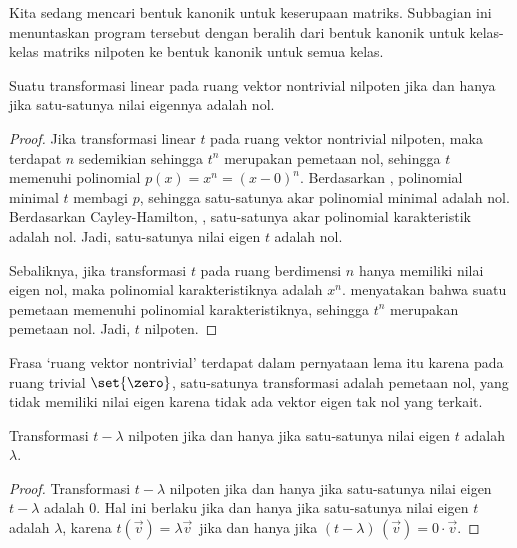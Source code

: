 Kita sedang mencari bentuk kanonik untuk keserupaan matriks.
Subbagian ini menuntaskan program tersebut dengan beralih
dari bentuk kanonik untuk kelas-kelas
matriks nilpoten ke
bentuk kanonik untuk semua kelas.

\begin{lemma} \label{le:NilIffOnlyEigenZero}
Suatu transformasi linear pada ruang vektor nontrivial
nilpoten jika dan hanya jika satu-satunya nilai eigennya adalah nol.
\end{lemma}

\begin{proof}
Jika transformasi linear $t$ pada ruang vektor nontrivial
nilpoten, maka terdapat
$n$ sedemikian sehingga $t^n$ merupakan pemetaan nol,
sehingga $t$ memenuhi polinomial $p(x)=x^n=(x-0)^n$.
Berdasarkan , polinomial minimal
$t$ membagi $p$, sehingga satu-satunya akar polinomial minimal adalah nol.
Berdasarkan Cayley-Hamilton, ,
satu-satunya akar polinomial karakteristik adalah nol.
Jadi, satu-satunya nilai eigen $t$ adalah nol.

Sebaliknya, jika transformasi \( t \) pada ruang
berdimensi \( n \) hanya memiliki nilai eigen nol,
maka polinomial karakteristiknya adalah \( x^n \).
 menyatakan bahwa suatu pemetaan memenuhi
polinomial karakteristiknya, sehingga \( t^n \) merupakan pemetaan nol.
Jadi, $t$ nilpoten.
\end{proof}

\noindent Frasa `ruang vektor nontrivial' terdapat dalam pernyataan
lema itu karena pada ruang trivial
$\set{\zero}$, satu-satunya transformasi adalah pemetaan nol, yang tidak memiliki
nilai eigen karena tidak ada vektor eigen tak nol yang terkait.

\begin{corollary} \label{cor:tMinLambdaNilpotent}
Transformasi $t-\lambda$ nilpoten jika dan hanya jika
satu-satunya nilai eigen $t$ adalah $\lambda$.
\end{corollary}

\begin{proof}
Transformasi \( t-\lambda \) nilpoten jika dan hanya jika
satu-satunya nilai eigen $t-\lambda$ adalah \( 0 \).
Hal ini berlaku jika dan hanya jika satu-satunya nilai eigen $t$ adalah $\lambda$, karena
\( t(\vec{v})=\lambda\vec{v} \,\) jika dan
hanya jika \( (t-\lambda)\,(\vec{v})=0\cdot\vec{v} \).
\end{proof}


